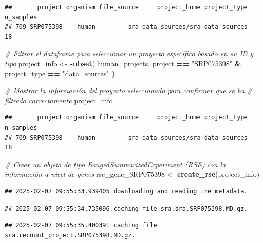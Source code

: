 \documentclass[
]{article}
\newenvironment{Shaded}{\begin{snugshade}}{\end{snugshade}}
\newcommand{\CommentTok}[1]{\textcolor[rgb]{0.56,0.35,0.01}{\textit{#1}}}
\newcommand{\FunctionTok}[1]{\textcolor[rgb]{0.13,0.29,0.53}{\textbf{#1}}}
\newcommand{\NormalTok}[1]{#1}
\newcommand{\OtherTok}[1]{\textcolor[rgb]{0.56,0.35,0.01}{#1}}
\newcommand{\SpecialCharTok}[1]{\textcolor[rgb]{0.81,0.36,0.00}{\textbf{#1}}}
\newcommand{\StringTok}[1]{\textcolor[rgb]{0.31,0.60,0.02}{#1}}
\begin{document}
\begin{verbatim}
##       project organism file_source     project_home project_type n_samples
## 709 SRP075398    human         sra data_sources/sra data_sources        18
\end{verbatim}

\begin{Shaded}
\begin{Highlighting}[]
\CommentTok{\# Filtrar el dataframe para seleccionar un proyecto específico basado en su ID y tipo}
\NormalTok{project\_info }\OtherTok{\textless{}{-}} \FunctionTok{subset}\NormalTok{(}
\NormalTok{  human\_projects,}
\NormalTok{  project }\SpecialCharTok{==} \StringTok{"SRP075398"} \SpecialCharTok{\&}\NormalTok{ project\_type }\SpecialCharTok{==} \StringTok{"data\_sources"}
\NormalTok{)}

\CommentTok{\# Mostrar la información del proyecto seleccionado para confirmar que se ha}
\CommentTok{\# filtrado correctamente}
\NormalTok{project\_info}
\end{Highlighting}
\end{Shaded}

\begin{verbatim}
##       project organism file_source     project_home project_type n_samples
## 709 SRP075398    human         sra data_sources/sra data_sources        18
\end{verbatim}

\begin{Shaded}
\begin{Highlighting}[]
\CommentTok{\# Crear un objeto de tipo RangedSummarizedExperiment (RSE) con la información a nivel de genes}
\NormalTok{rse\_gene\_SRP075398 }\OtherTok{\textless{}{-}} \FunctionTok{create\_rse}\NormalTok{(project\_info)}
\end{Highlighting}
\end{Shaded}

\begin{verbatim}
## 2025-02-07 09:55:33.939405 downloading and reading the metadata.
\end{verbatim}

\begin{verbatim}
## 2025-02-07 09:55:34.735096 caching file sra.sra.SRP075398.MD.gz.
\end{verbatim}

\begin{verbatim}
## 2025-02-07 09:55:35.400391 caching file sra.recount_project.SRP075398.MD.gz.
\end{verbatim}
\end{document}
